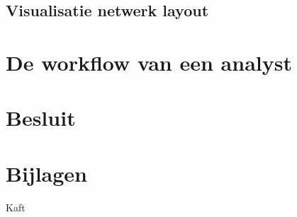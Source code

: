 \documentclass[a4paper,12pt]{report}
\begin{document}
\section{Visualisatie netwerk layout}

\chapter{De workflow van een analyst}


\chapter*{Besluit}
\blindtext

\chapter*{Bijlagen}
\blindtext

\printbibliography
{}

\newpage
\thispagestyle{empty}
\mbox{}

\newpage
Kaft
\end{document}
